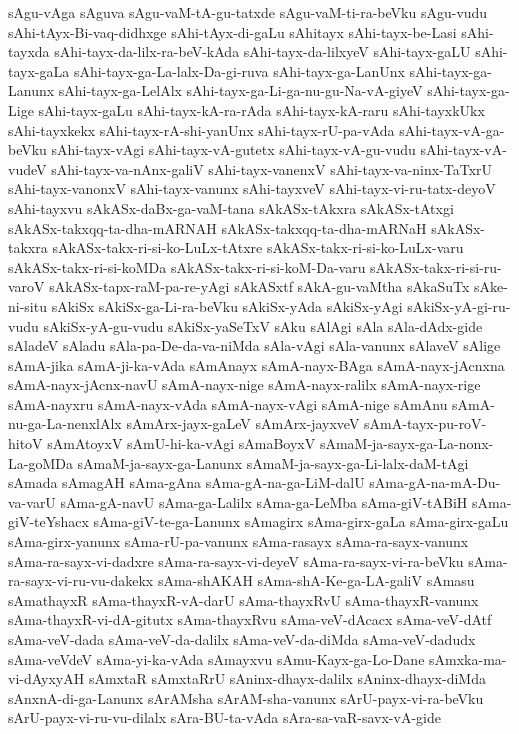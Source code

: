 {sAgu-vAga
sAguva
sAgu-vaM-tA-gu-tatxde
sAgu-vaM-ti-ra-beVku
sAgu-vudu
sAhi-tAyx-Bi-vaq-didhxge
sAhi-tAyx-di-gaLu
sAhitayx
sAhi-tayx-be-Lasi
sAhi-tayxda
sAhi-tayx-da-lilx-ra-beV-kAda
sAhi-tayx-da-lilxyeV
sAhi-tayx-gaLU
sAhi-tayx-gaLa
sAhi-tayx-ga-La-lalx-Da-gi-ruva
sAhi-tayx-ga-LanUnx
sAhi-tayx-ga-Lanunx
sAhi-tayx-ga-LelAlx
sAhi-tayx-ga-Li-ga-nu-gu-Na-vA-giyeV
sAhi-tayx-ga-Lige
sAhi-tayx-gaLu
sAhi-tayx-kA-ra-rAda
sAhi-tayx-kA-raru
sAhi-tayxkUkx
sAhi-tayxkekx
sAhi-tayx-rA-shi-yanUnx
sAhi-tayx-rU-pa-vAda
sAhi-tayx-vA-ga-beVku
sAhi-tayx-vAgi
sAhi-tayx-vA-gutetx
sAhi-tayx-vA-gu-vudu
sAhi-tayx-vA-vudeV
sAhi-tayx-va-nAnx-galiV
sAhi-tayx-vanenxV
sAhi-tayx-va-ninx-TaTxrU
sAhi-tayx-vanonxV
sAhi-tayx-vanunx
sAhi-tayxveV
sAhi-tayx-vi-ru-tatx-deyoV
sAhi-tayxvu
sAkASx-daBx-ga-vaM-tana
sAkASx-tAkxra
sAkASx-tAtxgi
sAkASx-takxqq-ta-dha-mARNAH
sAkASx-takxqq-ta-dha-mARNaH
sAkASx-takxra
sAkASx-takx-ri-si-ko-LuLx-tAtxre
sAkASx-takx-ri-si-ko-LuLx-varu
sAkASx-takx-ri-si-koMDa
sAkASx-takx-ri-si-koM-Da-varu
sAkASx-takx-ri-si-ru-varoV
sAkASx-tapx-raM-pa-re-yAgi
sAkASxtf
sAkA-gu-vaMtha
sAkaSuTx
sAke-ni-situ
sAkiSx
sAkiSx-ga-Li-ra-beVku
sAkiSx-yAda
sAkiSx-yAgi
sAkiSx-yA-gi-ru-vudu
sAkiSx-yA-gu-vudu
sAkiSx-yaSeTxV
sAku
sAlAgi
sAla
sAla-dAdx-gide
sAladeV
sAladu
sAla-pa-De-da-va-niMda
sAla-vAgi
sAla-vanunx
sAlaveV
sAlige
sAmA-jika
sAmA-ji-ka-vAda
sAmAnayx
sAmA-nayx-BAga
sAmA-nayx-jAcnxna
sAmA-nayx-jAcnx-navU
sAmA-nayx-nige
sAmA-nayx-ralilx
sAmA-nayx-rige
sAmA-nayxru
sAmA-nayx-vAda
sAmA-nayx-vAgi
sAmA-nige
sAmAnu
sAmA-nu-ga-La-nenxlAlx
sAmArx-jayx-gaLeV
sAmArx-jayxveV
sAmA-tayx-pu-roV-hitoV
sAmAtoyxV
sAmU-hi-ka-vAgi
sAmaBoyxV
sAmaM-ja-sayx-ga-La-nonx-La-goMDa
sAmaM-ja-sayx-ga-Lanunx
sAmaM-ja-sayx-ga-Li-lalx-daM-tAgi
sAmada
sAmagAH
sAma-gAna
sAma-gA-na-ga-LiM-dalU
sAma-gA-na-mA-Du-va-varU
sAma-gA-navU
sAma-ga-Lalilx
sAma-ga-LeMba
sAma-giV-tABiH
sAma-giV-teYshacx
sAma-giV-te-ga-Lanunx
sAmagirx
sAma-girx-gaLa
sAma-girx-gaLu
sAma-girx-yanunx
sAma-rU-pa-vanunx
sAma-rasayx
sAma-ra-sayx-vanunx
sAma-ra-sayx-vi-dadxre
sAma-ra-sayx-vi-deyeV
sAma-ra-sayx-vi-ra-beVku
sAma-ra-sayx-vi-ru-vu-dakekx
sAma-shAKAH
sAma-shA-Ke-ga-LA-galiV
sAmasu
sAmathayxR
sAma-thayxR-vA-darU
sAma-thayxRvU
sAma-thayxR-vanunx
sAma-thayxR-vi-dA-gitutx
sAma-thayxRvu
sAma-veV-dAcacx
sAma-veV-dAtf
sAma-veV-dada
sAma-veV-da-dalilx
sAma-veV-da-diMda
sAma-veV-dadudx
sAma-veVdeV
sAma-yi-ka-vAda
sAmayxvu
sAmu-Kayx-ga-Lo-Dane
sAmxka-ma-vi-dAyxyAH
sAmxtaR
sAmxtaRrU
sAninx-dhayx-dalilx
sAninx-dhayx-diMda
sAnxnA-di-ga-Lanunx
sArAMsha
sArAM-sha-vanunx
sArU-payx-vi-ra-beVku
sArU-payx-vi-ru-vu-dilalx
sAra-BU-ta-vAda
sAra-sa-vaR-savx-vA-gide
}

